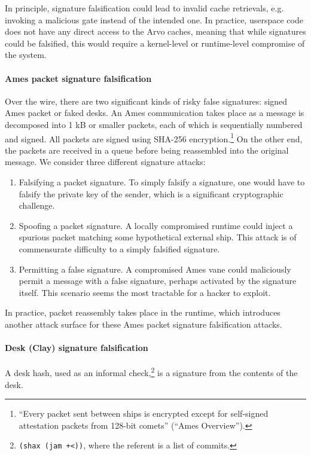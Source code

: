 \documentclass[twoside]{article}
\begin{document}
\sloppy
In principle, signature falsification could lead to invalid cache retrievals, e.g. invoking a malicious gate instead of the intended one.  In practice, userspace code does not have any direct access to the Arvo caches, meaning that while signatures could be falsified, this would require a kernel-level or runtime-level compromise of the system.

\paragraph{Ames packet signature falsification}
Over the wire, there are two significant kinds of risky false signatures:  signed Ames packet or faked desks.  An Ames communication takes place as a message is decomposed into 1 kB or smaller packets, each of which is sequentially numbered and signed.  All packets are signed using SHA-256 encryption.\footnote{“Every packet sent between ships is encrypted except for self-signed attestation packets from 128-bit comets” (“Ames  Overview”).}  On the other end, the packets are received in a queue before being reassembled into the original message.  We consider three different signature attacks:

\begin{enumerate}
  \item  Falsifying a packet signature.  To simply falsify a signature, one would have to falsify the private key of the sender, which is a significant cryptographic challenge.
  \item  Spoofing a packet signature.  A locally compromised runtime could inject a spurious packet matching some hypothetical external ship.  This attack is of commensurate difficulty to a simply falsified signature.
  \item  Permitting a false signature.  A compromised Ames vane could maliciously permit a message with a false signature, perhaps activated by the signature itself.  This scenario seems the most tractable for a hacker to exploit.
\end{enumerate}

In practice, packet reassembly takes place in the runtime, which introduces another attack surface for these Ames packet signature falsification attacks.

\paragraph{Desk (Clay) signature falsification}
A desk hash, used as an informal check,\footnote{\lstinline[style=inlinecode]{(shax (jam +<))}, where the referent is a list of commits.} is a signature from the contents of the desk.  
\end{document}
